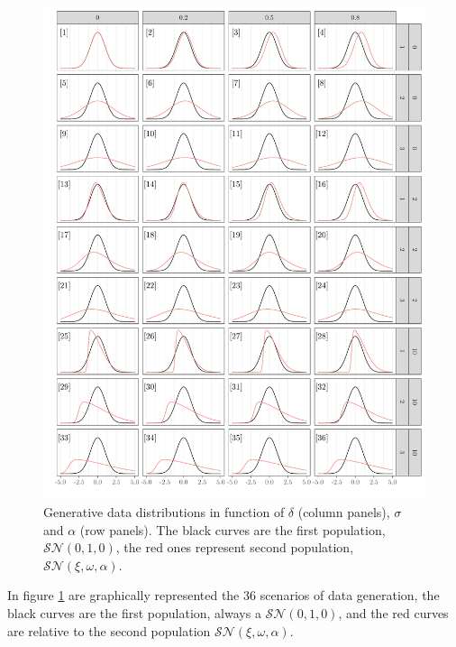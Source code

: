\documentclass[twocolumn]{article}\usepackage[]{graphicx}\usepackage[]{xcolor}
\makeatletter
\def\maxwidth{ %
  \ifdim\Gin@nat@width>\linewidth
    \linewidth
  \else
    \Gin@nat@width
  \fi
}
\newenvironment{knitrout}{}{} %
\makeatother
\begin{document}
\begin{figure}
\begin{knitrout}
\color{fgcolor}

{\centering \includegraphics[width=\maxwidth]{figure/alpha0-1} 

}


\end{knitrout}
\caption{Generative data distributions in function of $\delta$ (column panels),  $\sigma$ and $\alpha$ (row panels). The black curves are the first population, $\mathcal{SN}(0,1,0)$, the red ones represent second population, $\mathcal{SN}(\xi,\omega,\alpha)$.\label{fig:alpha0}}
\end{figure}

In figure \ref{fig:alpha0} are graphically represented the 36 scenarios of data generation, the black curves are the first population, always a $\mathcal{SN}(0,1,0)$, and the red curves are relative to the second population $\mathcal{SN}(\xi,\omega,\alpha)$.
\end{document}
